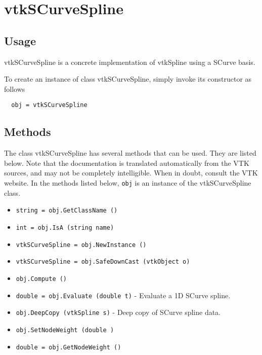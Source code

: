 \section{vtkSCurveSpline}

\subsection{Usage}

 vtkSCurveSpline is a concrete implementation of vtkSpline using a
 SCurve basis.

To create an instance of class vtkSCurveSpline, simply
invoke its constructor as follows
\begin{verbatim}
  obj = vtkSCurveSpline
\end{verbatim}
\subsection{Methods}

The class vtkSCurveSpline has several methods that can be used.
  They are listed below.
Note that the documentation is translated automatically from the VTK sources,
and may not be completely intelligible.  When in doubt, consult the VTK website.
In the methods listed below, \verb|obj| is an instance of the vtkSCurveSpline class.
\begin{itemize}
\item  \verb|string = obj.GetClassName ()|

\item  \verb|int = obj.IsA (string name)|

\item  \verb|vtkSCurveSpline = obj.NewInstance ()|

\item  \verb|vtkSCurveSpline = obj.SafeDownCast (vtkObject o)|

\item  \verb|obj.Compute ()|

\item  \verb|double = obj.Evaluate (double t)| -  Evaluate a 1D SCurve spline.

\item  \verb|obj.DeepCopy (vtkSpline s)| -  Deep copy of SCurve spline data.

\item  \verb|obj.SetNodeWeight (double )|

\item  \verb|double = obj.GetNodeWeight ()|

\end{itemize}
